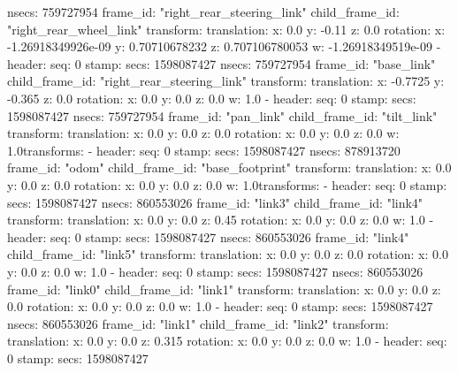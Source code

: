         nsecs: 759727954
      frame_id: "right_rear_steering_link"
    child_frame_id: "right_rear_wheel_link"
    transform: 
      translation: 
        x: 0.0
        y: -0.11
        z: 0.0
      rotation: 
        x: -1.26918349926e-09
        y: 0.70710678232
        z: 0.707106780053
        w: -1.26918349519e-09
  - 
    header: 
      seq: 0
      stamp: 
        secs: 1598087427
        nsecs: 759727954
      frame_id: "base_link"
    child_frame_id: "right_rear_steering_link"
    transform: 
      translation: 
        x: -0.7725
        y: -0.365
        z: 0.0
      rotation: 
        x: 0.0
        y: 0.0
        z: 0.0
        w: 1.0
  - 
    header: 
      seq: 0
      stamp: 
        secs: 1598087427
        nsecs: 759727954
      frame_id: "pan_link"
    child_frame_id: "tilt_link"
    transform: 
      translation: 
        x: 0.0
        y: 0.0
        z: 0.0
      rotation: 
        x: 0.0
        y: 0.0
        z: 0.0
        w: 1.0transforms: 
  - 
    header: 
      seq: 0
      stamp: 
        secs: 1598087427
        nsecs: 878913720
      frame_id: "odom"
    child_frame_id: "base_footprint"
    transform: 
      translation: 
        x: 0.0
        y: 0.0
        z: 0.0
      rotation: 
        x: 0.0
        y: 0.0
        z: 0.0
        w: 1.0transforms: 
  - 
    header: 
      seq: 0
      stamp: 
        secs: 1598087427
        nsecs: 860553026
      frame_id: "link3"
    child_frame_id: "link4"
    transform: 
      translation: 
        x: 0.0
        y: 0.0
        z: 0.45
      rotation: 
        x: 0.0
        y: 0.0
        z: 0.0
        w: 1.0
  - 
    header: 
      seq: 0
      stamp: 
        secs: 1598087427
        nsecs: 860553026
      frame_id: "link4"
    child_frame_id: "link5"
    transform: 
      translation: 
        x: 0.0
        y: 0.0
        z: 0.0
      rotation: 
        x: 0.0
        y: 0.0
        z: 0.0
        w: 1.0
  - 
    header: 
      seq: 0
      stamp: 
        secs: 1598087427
        nsecs: 860553026
      frame_id: "link0"
    child_frame_id: "link1"
    transform: 
      translation: 
        x: 0.0
        y: 0.0
        z: 0.0
      rotation: 
        x: 0.0
        y: 0.0
        z: 0.0
        w: 1.0
  - 
    header: 
      seq: 0
      stamp: 
        secs: 1598087427
        nsecs: 860553026
      frame_id: "link1"
    child_frame_id: "link2"
    transform: 
      translation: 
        x: 0.0
        y: 0.0
        z: 0.315
      rotation: 
        x: 0.0
        y: 0.0
        z: 0.0
        w: 1.0
  - 
    header: 
      seq: 0
      stamp: 
        secs: 1598087427
